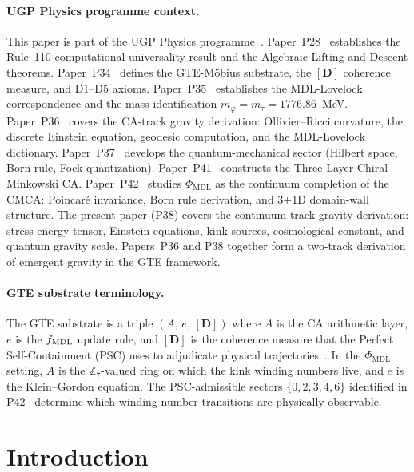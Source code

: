 \documentclass[11pt]{article}
\theoremstyle{remark}
\newcommand{\PHIMDL}{\Phi_{\mathrm{MDL}}}
\newcommand{\ZS}{\mathbb{Z}_7}
\newcommand{\mtau}{m_\tau}
\newcommand{\mphi}{m_\varphi}
\newcommand{\fmdl}{f_{\rm MDL}}
\begin{document}
\medskip

\paragraph{UGP Physics programme context.}
This paper is part of the UGP Physics programme~\cite{SpivackResearchProgrammes}.
Paper~P28~\cite{SpivackCompUniversality} establishes the Rule~110 computational-universality
result and the Algebraic Lifting and Descent theorems.
Paper~P34~\cite{SpivackGTEMobius} defines the GTE-M\"{o}bius substrate, the $[\mathbf{D}]$
coherence measure, and D1--D5 axioms.
Paper~P35~\cite{SpivackGTEUnification} establishes the MDL-Lovelock correspondence and the
mass identification $\mphi = \mtau = 1776.86$~MeV.
Paper~P36~\cite{SpivackEmergentGravity} covers the CA-track gravity derivation: Ollivier--Ricci
curvature, the discrete Einstein equation, geodesic computation, and the MDL-Lovelock
dictionary.
Paper~P37~\cite{SpivackQMFromR110} develops the quantum-mechanical sector (Hilbert space,
Born rule, Fock quantization).
Paper~P41~\cite{SpivackCMCA} constructs the Three-Layer Chiral Minkowski CA.
Paper~P42~\cite{SpivackPhiMDLField} studies $\PHIMDL$ as the continuum completion of the
CMCA: Poincar\'e invariance, Born rule derivation, and 3+1D domain-wall structure.
The present paper (P38) covers the continuum-track gravity derivation: stress-energy
tensor, Einstein equations, kink sources, cosmological constant, and quantum gravity scale.
Papers~P36 and P38 together form a two-track derivation of emergent gravity in the GTE framework.

\paragraph{GTE substrate terminology.}
The GTE substrate is a triple $(A,\,e,\,[\mathbf{D}])$ where $A$ is the CA arithmetic layer,
$e$ is the $\fmdl$ update rule, and $[\mathbf{D}]$ is the coherence measure that the
Perfect Self-Containment (PSC) uses to adjudicate physical
trajectories~\cite{SpivackGTEMobius}.
In the $\PHIMDL$ setting, $A$ is the $\ZS$-valued ring on which the kink winding
numbers live, and $e$ is the Klein--Gordon equation.
The PSC-admissible sectors $\{0,2,3,4,6\}$ identified in P42~\cite{SpivackPhiMDLField} determine which
winding-number transitions are physically observable.

\section{Introduction}
\label{sec:intro}
\end{document}
